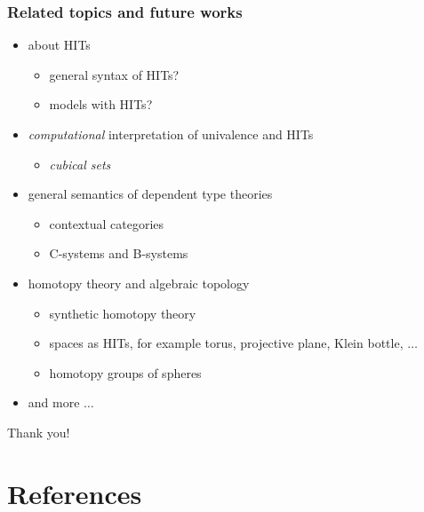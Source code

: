 \documentclass[dvipdfmx]{beamer}
\begin{document}
\begin{frame}
  \frametitle{Related topics and future works}
  \begin{itemize}
      \pause
    \item about HITs
      \begin{itemize}
        \item general syntax of HITs?
        \item models with HITs?
      \end{itemize}
      \pause
    \item {\it computational} interpretation of
      univalence and HITs
      \begin{itemize}
        \item {\it cubical sets}
          \cite{bezem_et_al:LIPIcs:2014:4628}
      \end{itemize}
      \pause
    \item general semantics of dependent type theories
      \begin{itemize}
        \item contextual categories
          \cite{Cartmell1986209}
        \item C-systems and B-systems
          \cite{voevodsky2014subsystems,voevodsky2014bsystems}
      \end{itemize}
      \pause
    \item homotopy theory and algebraic topology
      \begin{itemize}
        \item synthetic homotopy theory
        \item spaces as HITs, for example
          torus, projective plane, Klein bottle, $\dots$
        \item homotopy groups of spheres
      \end{itemize}
    \item and more $\dots$
  \end{itemize}
\end{frame}

\begin{frame}
  \begin{center}
    Thank you!
  \end{center}
\end{frame}

\begin{frame}
\end{frame}

\section{References}
\end{document}
